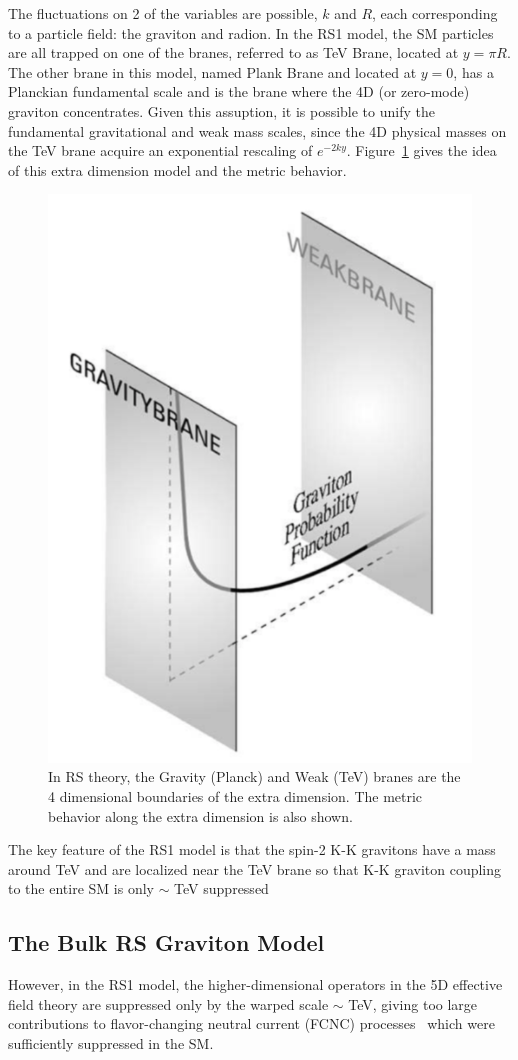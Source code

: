 \vspace{0.3cm}
The fluctuations on 2 of the variables are possible, $k$ and $R$, each corresponding to a particle field: the graviton and radion. In the RS1 model, the SM particles are all trapped on one of the branes, referred to as TeV Brane, located at $y=\pi R$. The other brane in this model, named Plank Brane and located at $y=0$, has a Planckian fundamental scale and is the brane where the 4D (or zero-mode) graviton concentrates. Given this assuption, it is possible to unify the fundamental gravitational and weak mass scales, since the 4D physical masses on the TeV brane acquire an exponential rescaling of $e^{-2ky}$. Figure~\ref{fig:intro_branes} gives the idea of this extra dimension model and the metric behavior.
\begin{figure}[htbp]
\begin{center}
\includegraphics[width=0.32\linewidth]{figures/intro_branes.png}
\caption{In RS theory, the Gravity (Planck) and Weak (TeV) branes are the 4 dimensional boundaries of the extra dimension. The metric behavior along the extra dimension is also shown.}
\label{fig:intro_branes}
\end{center}
\end{figure}

The key feature of the RS1 model is that the spin-2 K-K gravitons have a mass around TeV and are localized near the TeV brane so that K-K graviton coupling to the entire SM is only $\sim$ TeV suppressed
\subsection{The Bulk RS Graviton Model}
However, in the RS1 model, the higher-dimensional operators in the 5D effective field theory are suppressed only by the warped scale $\sim$ TeV, giving too large contributions to flavor-changing neutral current (FCNC) processes~\cite{intro_rsfcnc1,intro_rsfcnc2} which were sufficiently suppressed in the SM.

